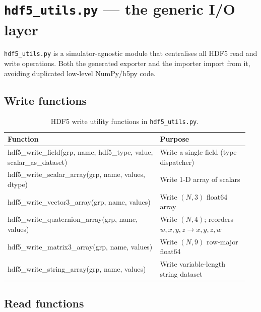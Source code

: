 \documentclass[11pt,a4paper]{article}
\begin{document}
\section{\texttt{hdf5\_utils.py} --- the generic I/O layer}
\label{sec:hdf5utils}

\texttt{hdf5\_utils.py} is a simulator-agnostic module that centralises
all HDF5 read and write operations. Both the generated exporter and the
importer import from it, avoiding duplicated low-level NumPy/h5py code.

\subsection{Write functions}

\begin{table}[htbp]
\centering
\begin{tabularx}{\textwidth}{>{\ttfamily\small\raggedright\arraybackslash}p{0.60\linewidth}>{\small\raggedright\arraybackslash}p{0.35\linewidth}}
\toprule
\sffamily\textbf{Function} & \sffamily\textbf{Purpose} \\
\midrule
hdf5\_write\_field(grp, name, hdf5\_type, value, scalar\_as\_dataset) &
  Write a single field (type dispatcher) \\
hdf5\_write\_scalar\_array(grp, name, values, dtype) &
  Write 1-D array of scalars \\
hdf5\_write\_vector3\_array(grp, name, values) &
  Write $(N,3)$ float64 array \\
hdf5\_write\_quaternion\_array(grp, name, values) &
  Write $(N,4)$; reorders $w,x,y,z \to x,y,z,w$ \\
hdf5\_write\_matrix3\_array(grp, name, values) &
  Write $(N,9)$ row-major float64 \\
hdf5\_write\_string\_array(grp, name, values) &
  Write variable-length string dataset \\
\bottomrule
\end{tabularx}
\caption{HDF5 write utility functions in \texttt{hdf5\_utils.py}.}
\end{table}

\subsection{Read functions}
\end{document}
